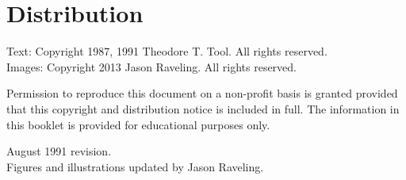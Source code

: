 \section*{Distribution}
Text: Copyright 1987, 1991 Theodore T. Tool. All rights reserved.\\
Images: Copyright 2013 Jason Raveling. All rights reserved.

Permission to reproduce this document on a non-profit basis is granted provided that this copyright and distribution notice is included in full.
The information in this booklet is provided for educational purposes only.

August 1991 revision.\\
Figures and illustrations updated by Jason Raveling.
